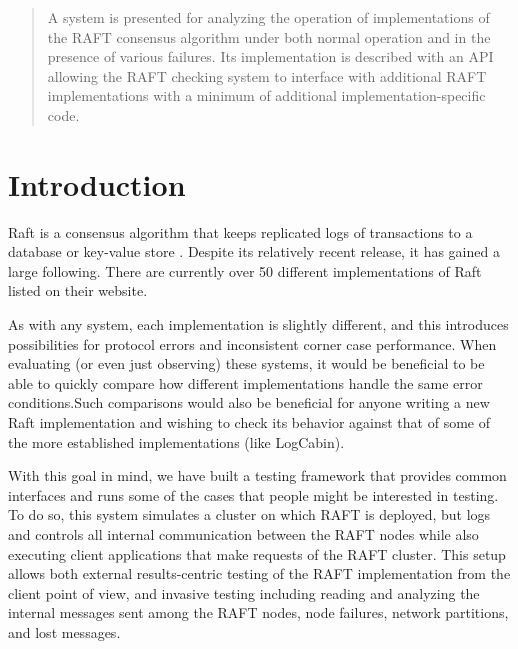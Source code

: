 \documentclass[UTF8]{article}
\begin{document}
 

\setlength\parindent{24pt}

\begin{abstract}
	
A system is presented for analyzing the operation of implementations of the RAFT consensus algorithm under both normal operation and in the presence of various failures. Its implementation is described with an API allowing the RAFT checking system to interface with additional RAFT implementations with a minimum of additional implementation-specific code.

\end{abstract} 

\section{Introduction}

Raft is a consensus algorithm that keeps replicated logs of transactions to a database or key-value store \cite{raftPaper}. Despite its relatively recent release, it has gained a large following. There are currently over 50 different implementations of Raft listed on their website.
 
As with any system, each implementation is slightly different, and this introduces possibilities for protocol errors and inconsistent corner case performance. When evaluating (or even just observing) these systems, it would be beneficial to be able to quickly compare how different implementations handle the same error conditions.Such comparisons would also be beneficial for anyone writing a new Raft implementation and wishing to check its behavior against that of some of the more established implementations (like LogCabin).

With this goal in mind, we have built a testing framework that provides common interfaces and runs some of the cases that people might be interested in testing. To do so, this system simulates a cluster on which RAFT is deployed, but logs and controls all internal communication between the RAFT nodes while also executing client applications that make requests of the RAFT cluster. This setup allows both external results-centric testing of the RAFT implementation from the client point of view, and invasive testing including reading and analyzing the internal messages sent among the RAFT nodes, node failures, network partitions, and lost messages.
\end{document}
